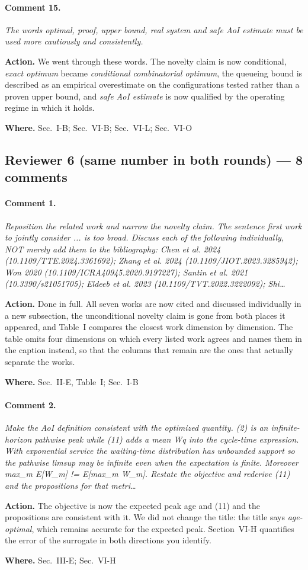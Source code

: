\documentclass[10pt]{article}
\newcommand{\rev}[1]{\par\medskip\noindent\textit{#1}\par\smallskip}
\newcommand{\act}[2]{\noindent\textbf{Action.} #1\par\noindent\textbf{Where.} #2\par}
\begin{document}
\paragraph{Comment 15.}
\rev{The words optimal, proof, upper bound, real system and safe AoI estimate must be used more cautiously and consistently.}
\act{We went through these words. The novelty claim is now conditional, \emph{exact optimum} became \emph{conditional combinatorial optimum}, the queueing bound is described as an empirical overestimate on the configurations tested rather than a proven upper bound, and \emph{safe AoI estimate} is now qualified by the operating regime in which it holds.}{Sec.~I-B; Sec.~VI-B; Sec.~VI-L; Sec.~VI-O}

\subsection*{Reviewer 6 (same number in both rounds) --- 8 comments}

\paragraph{Comment 1.}
\rev{Reposition the related work and narrow the novelty claim. The sentence first work to jointly consider ... is too broad. Discuss each of the following individually, NOT merely add them to the bibliography: Chen et al. 2024 (10.1109/TTE.2024.3361692); Zhang et al. 2024 (10.1109/JIOT.2023.3285942); Won 2020 (10.1109/ICRA40945.2020.9197227); Santin et al. 2021 (10.3390/s21051705); Eldeeb et al. 2023 (10.1109/TVT.2022.3222092); Shi\dots}
\act{Done in full. All seven works are now cited and discussed individually in a new subsection, the unconditional novelty claim is gone from both places it appeared, and Table~I compares the closest work dimension by dimension. The table omits four dimensions on which every listed work agrees and names them in the caption instead, so that the columns that remain are the ones that actually separate the works.}{Sec.~II-E, Table~I; Sec.~I-B}

\paragraph{Comment 2.}
\rev{Make the AoI definition consistent with the optimized quantity. (2) is an infinite-horizon pathwise peak while (11) adds a mean Wq into the cycle-time expression. With exponential service the waiting-time distribution has unbounded support so the pathwise limsup may be infinite even when the expectation is finite. Moreover max\_m E[W\_m] != E[max\_m W\_m]. Restate the objective and rederive (11) and the propositions for that metri\dots}
\act{The objective is now the expected peak age and (11) and the propositions are consistent with it. We did not change the title: the title says \emph{age-optimal}, which remains accurate for the expected peak. Section~VI-H quantifies the error of the surrogate in both directions you identify.}{Sec.~III-E; Sec.~VI-H}
\end{document}
